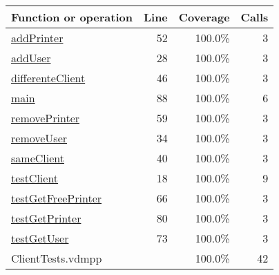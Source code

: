 \bigskip
\begin{longtable}{|l|r|r|r|}
\hline
Function or operation & Line & Coverage & Calls \\
\hline
\hline
\hyperref[addPrinter:52]{addPrinter} & 52&100.0\% & 3 \\
\hline
\hyperref[addUser:28]{addUser} & 28&100.0\% & 3 \\
\hline
\hyperref[differenteClient:46]{differenteClient} & 46&100.0\% & 3 \\
\hline
\hyperref[main:88]{main} & 88&100.0\% & 6 \\
\hline
\hyperref[removePrinter:59]{removePrinter} & 59&100.0\% & 3 \\
\hline
\hyperref[removeUser:34]{removeUser} & 34&100.0\% & 3 \\
\hline
\hyperref[sameClient:40]{sameClient} & 40&100.0\% & 3 \\
\hline
\hyperref[testClient:18]{testClient} & 18&100.0\% & 9 \\
\hline
\hyperref[testGetFreePrinter:66]{testGetFreePrinter} & 66&100.0\% & 3 \\
\hline
\hyperref[testGetPrinter:80]{testGetPrinter} & 80&100.0\% & 3 \\
\hline
\hyperref[testGetUser:73]{testGetUser} & 73&100.0\% & 3 \\
\hline
\hline
ClientTests.vdmpp & & 100.0\% & 42 \\
\hline
\end{longtable}


